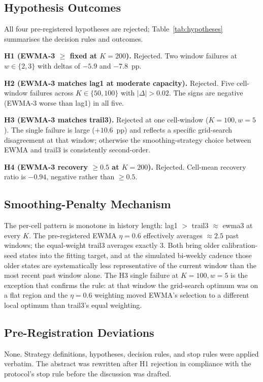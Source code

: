 \subsection{Hypothesis Outcomes}



All four pre-registered hypotheses are rejected;
Table~\ref{tab:hypotheses} summarises the decision rules and outcomes.

\textbf{H1 (EWMA-3 $\geq$ fixed at $K = 200$).} Rejected. Two
window failures at $w \in \{2, 3\}$ with deltas of $-5.9$ and
$-7.8$~pp.

\textbf{H2 (EWMA-3 matches \textsf{lag1} at moderate capacity).}
Rejected. Five cell-window failures across $K \in \{50, 100\}$ with
$|\Delta| > 0.02$. The signs are negative (EWMA-3 worse than
\textsf{lag1}) in all five.

\textbf{H3 (EWMA-3 matches \textsf{trail3}).} Rejected at one
cell-window ($K = 100, w = 5$). The single failure is large
($+10.6$~pp) and reflects a specific grid-search disagreement at
that window; otherwise the smoothing-strategy choice between EWMA
and trail3 is consistently second-order.

\textbf{H4 (EWMA-3 recovery $\geq 0.5$ at $K = 200$).} Rejected.
Cell-mean recovery ratio is $-0.94$, negative rather than $\geq 0.5$.

\subsection{Smoothing-Penalty Mechanism}

The per-cell pattern is monotone in history length:
\textsf{lag1} $>$ \textsf{trail3} $\approx$ \textsf{ewma3} at every
$K$. The pre-registered EWMA $\eta = 0.6$ effectively averages
$\approx 2.5$ past windows; the equal-weight \textsf{trail3} averages
exactly 3. Both bring older calibration-seed states into the
fitting target, and at the simulated bi-weekly cadence those older
states are systematically less representative of the current window
than the most recent past window alone. The H3 single failure at
$K = 100, w = 5$ is the exception that confirms the rule: at that
window the grid-search optimum was on a flat region and the
$\eta = 0.6$ weighting moved EWMA's selection to a different local
optimum than trail3's equal weighting.

\subsection{Pre-Registration Deviations}

None. Strategy definitions, hypotheses, decision rules, and stop
rules were applied verbatim. The abstract was rewritten after H1
rejection in compliance with the protocol's stop rule before the
discussion was drafted.
